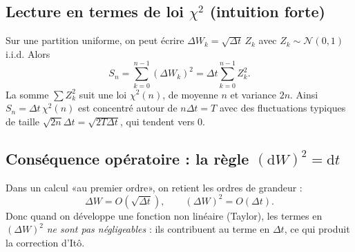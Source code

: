 \documentclass[11pt,a4paper]{report}
\theoremstyle{definition}
\theoremstyle{plain}
\theoremstyle{remark}
\newcommand{\dd}{\mathrm{d}}
\newcommand{\1}{\mathbf{1}}
\newcommand{\Normal}{\mathcal{N}}
\begin{document}
\subsection*{Lecture en termes de loi $\chi^2$ (intuition forte)}
Sur une partition uniforme, on peut écrire $\Delta W_k=\sqrt{\Delta t}\,Z_k$ avec $Z_k\sim\Normal(0,1)$ i.i.d. Alors
\[
S_n=\sum_{k=0}^{n-1}(\Delta W_k)^2 = \Delta t \sum_{k=0}^{n-1} Z_k^2.
\]
La somme $\sum Z_k^2$ suit une loi $\chi^2(n)$, de moyenne $n$ et variance $2n$.
Ainsi $S_n = \Delta t\,\chi^2(n)$ est concentré autour de $n\Delta t=T$ avec des fluctuations typiques de taille $\sqrt{2n}\Delta t = \sqrt{2T\Delta t}$, qui tendent vers 0.

\subsection*{Conséquence opératoire : la règle $(\dd W)^2=\dd t$}
Dans un calcul «au premier ordre», on retient les ordres de grandeur :
\[
\Delta W = O(\sqrt{\Delta t}),\qquad (\Delta W)^2 = O(\Delta t).
\]
Donc quand on développe une fonction non linéaire (Taylor), les termes en $(\Delta W)^2$ \emph{ne sont pas négligeables} : ils contribuent au terme en $\Delta t$, ce qui produit la correction d'Itô.


\end{document}

